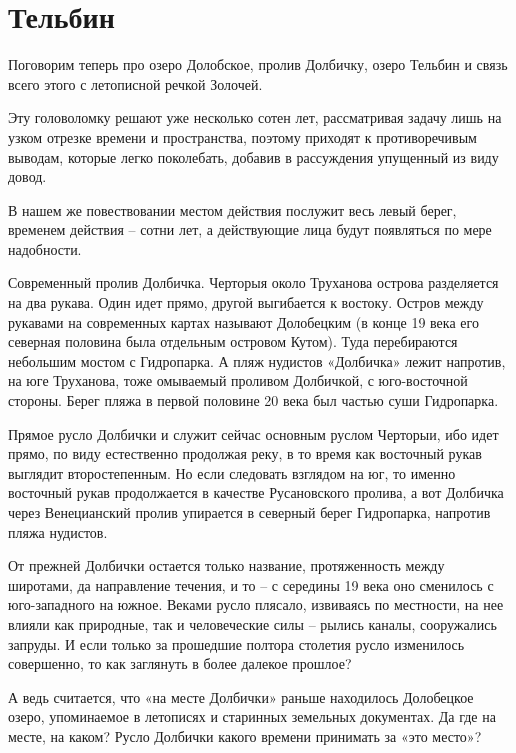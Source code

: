 \chapter{Тельбин}

Поговорим теперь про озеро Долобское, пролив Долбичку, озеро Тельбин и связь всего этого с летописной речкой Золочей.

Эту головоломку решают уже несколько сотен лет, рассматривая задачу лишь на узком отрезке времени и пространства, поэтому приходят к противоречивым выводам, которые легко поколебать, добавив в рассуждения упущенный из виду довод.

В нашем же повествовании местом действия послужит весь левый берег, временем действия – сотни лет, а действующие лица будут появляться по мере надобности.

Современный пролив Долбичка. Черторыя около Труханова острова разделяется на два рукава. Один идет прямо, другой выгибается к востоку. Остров между рукавами на современных картах называют Долобецким (в конце 19 века его северная половина была отдельным островом Кутом). Туда перебираются небольшим мостом с Гидропарка. А пляж нудистов «Долбичка» лежит напротив, на юге Труханова, тоже омываемый проливом Долбичкой, с юго-восточной стороны. Берег пляжа в первой половине 20 века был частью суши Гидропарка.

Прямое русло Долбички и служит сейчас основным руслом Черторыи, ибо идет прямо, по виду естественно продолжая реку, в то время как восточный рукав выглядит второстепенным. Но если следовать взглядом на юг, то именно восточный рукав продолжается в качестве Русановского пролива, а вот Долбичка через Венецианский пролив упирается в северный берег Гидропарка, напротив пляжа нудистов.

От прежней Долбички остается только название, протяженность между широтами, да направление течения, и то – с середины 19 века оно сменилось с юго-западного на южное. Веками русло плясало, извиваясь по местности, на нее влияли как природные, так и человеческие силы – рылись каналы, сооружались запруды. И если только за прошедшие полтора столетия русло изменилось совершенно, то как заглянуть в более далекое прошлое?

А ведь считается, что «на месте Долбички» раньше находилось Долобецкое озеро, упоминаемое в летописях и старинных земельных документах. Да где на месте, на каком? Русло Долбички какого времени принимать за «это место»?

